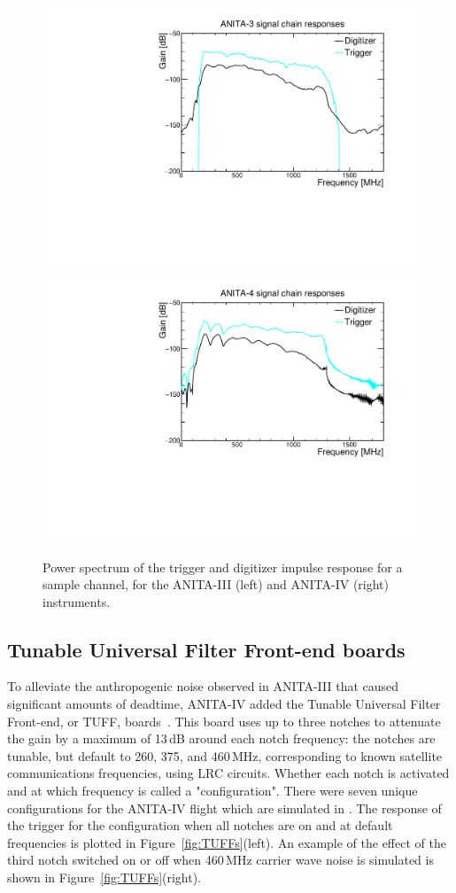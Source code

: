 \begin{figure}[!h]\centering
  \includegraphics[width=.45\linewidth]{./Figs/A3ImpulseResponses.pdf}
  \includegraphics[width=.45\linewidth]{./Figs/A4ImpulseResponses.pdf}
  \caption{Power spectrum of the trigger and digitizer impulse
    response for a sample channel, for the ANITA-III (left) and ANITA-IV (right) instruments. 
    }
  \label{fig:ANITA_ImpulseResponses}
\end{figure}


\subsection{Tunable Universal Filter Front-end boards}
\label{subsec:tuffs}
To alleviate the anthropogenic noise observed in ANITA-III that caused
significant amounts of deadtime, ANITA-IV added the Tunable Universal
Filter Front-end, or TUFF, boards~\cite{Allison:2017vtk}.
This board uses up to three notches to attenuate
the gain by a maximum of 13\,dB around each notch
frequency:
the notches are tunable, but default to 260, 375, and 460\,MHz, corresponding to known satellite communications frequencies, using LRC circuits. 
Whether each notch is activated and at which frequency is called
a "configuration".
There were seven unique configurations for the ANITA-IV flight  which are simulated in 
\icemc. 
The response of the trigger for the configuration when all notches are on and at default frequencies is plotted in Figure~\ref{fig:TUFFs}(left). 
An example of the effect of the third notch switched on or off when 460\,MHz carrier wave noise is simulated is shown in Figure~\ref{fig:TUFFs}(right).

